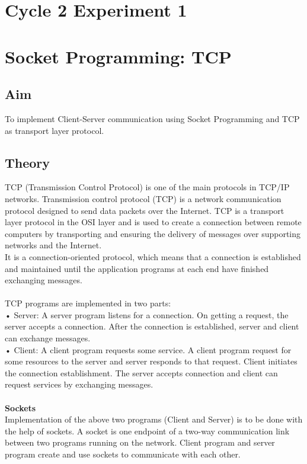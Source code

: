 \section*{Cycle 2 Experiment 1 }

\section{\Large{Socket Programming: TCP}}

\subsection{Aim}
\large To implement Client-Server communication using Socket Programming and TCP as transport
layer protocol.

\subsection{Theory}
TCP (Transmission Control Protocol) is one of the main protocols in TCP/IP networks. Transmission control protocol (TCP) is a network communication protocol designed to send data packets over the Internet. TCP is a transport layer protocol in the OSI layer and is used to create a connection between remote computers by transporting and ensuring the delivery of messages over supporting networks and the Internet.\\

It is a connection-oriented protocol, which means that a connection is established and maintained until the application programs at each end have finished exchanging messages.\\
\\
TCP programs are implemented in two parts:\\

• Server: A server program listens for a connection. On getting a request, the server accepts a connection. After the connection is established, server and client can exchange messages.\\

• Client: A client program requests some service. A client program request for some resources to the server and server responds to that request. Client initiates the connection establishment. The server accepts connection and
client can request services by exchanging messages.\\
\\
\textbf{Sockets}\\
Implementation of the above two programs (Client and Server) is to be done with the help of sockets. A socket is one endpoint of a two-way communication link between two programs running on the network. Client program and server program
create and use sockets to communicate with each other.

